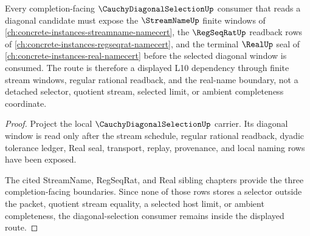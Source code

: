 \begin{theorem}
\label{thm:cauchy-diagonal-selection-regseqrat-streamname-real-completion-route}
Every completion-facing $\CauchyDiagonalSelectionUp$ consumer that reads a diagonal candidate must expose the $\StreamNameUp$ finite windows of \autoref{ch:concrete-instances-streamname-namecert}, the $\RegSeqRatUp$ readback rows of \autoref{ch:concrete-instances-regseqrat-namecert}, and the terminal $\RealUp$ seal of \autoref{ch:concrete-instances-real-namecert} before the selected diagonal window is consumed. The route is therefore a displayed L10 dependency through finite stream windows, regular rational readback, and the real-name boundary, not a detached selector, quotient stream, selected limit, or ambient completeness coordinate.
\end{theorem}
\begin{proof}
Project the local $\CauchyDiagonalSelectionUp$ carrier. Its diagonal window is read only after the stream schedule, regular rational readback, dyadic tolerance ledger, Real seal, transport, replay, provenance, and local naming rows have been exposed.

The cited StreamName, RegSeqRat, and Real sibling chapters provide the three completion-facing boundaries. Since none of those rows stores a selector outside the packet, quotient stream equality, a selected host limit, or ambient completeness, the diagonal-selection consumer remains inside the displayed route.
\end{proof}
